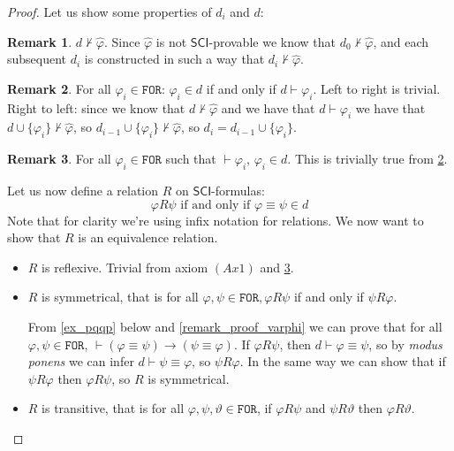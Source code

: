 \documentclass{article}
\theoremstyle{definition}
\theoremstyle{definition}
\theoremstyle{definition}
\newtheorem{remark}{Remark}[section]
\theoremstyle{definition}
\theoremstyle{definition}
\newcommand*{\id}{\equiv}
\newcommand*{\ra}{\rightarrow}
\newcommand*{\FOR}{\texttt{FOR}}
\newcommand{\SCI}{$\mathsf{SCI}$\xspace}
\begin{document}
\begin{proof}
    Let us show some properties of $d_i$ and $d$:
    \begin{remark}
        $d \not \vdash \hat{\varphi}$. Since $\hat{\varphi}$ is not \SCI-provable we know that $d_0 \not \vdash \hat{\varphi}$, and each subsequent $d_i$ is constructed in such a way that $d_i \not \vdash \hat{\varphi}$.
    \end{remark}
    \begin{remark}
        \label{d_in_same_follows}
        For all $\varphi_i \in \FOR$: $\varphi_i \in d$ if and only if $d \vdash
            \varphi_i$. Left to right is trivial. Right to left: since we know that $d \not
            \vdash \hat{\varphi}$ and we have that $d \vdash \varphi_i$ we have that $d
            \cup \{\varphi_i\} \not \vdash \hat{\varphi}$, so $d_{i-1} \cup \{\varphi_i\} \not \vdash \hat{\varphi}$, so $d_i = d_{i-1} \cup
            \{\varphi_i\}$.
    \end{remark}
    \begin{remark}
        \label{d_has_theorems}
        For all $\varphi_i \in \FOR$ such that $\vdash \varphi_i$, $\varphi_i \in d$. This is trivially true from \cref{d_in_same_follows}.
    \end{remark}
    Let us now define a relation $R$ on \SCI-formulas: $$ \varphi R \psi \text{ if
            and only if } \varphi \id \psi \in d $$
    Note that for clarity we're using infix notation for relations. We now want to
    show that $R$ is an equivalence relation.
    \begin{itemize}[]
        \item $R$ is reflexive. Trivial from axiom $(Ax1)$ and \cref{d_has_theorems}.
        \item $R$ is symmetrical, that is for all $\varphi, \psi \in \FOR, \varphi R \psi$ if and only if $\psi R \varphi$.

              From \cref{ex_pqqp} below and \cref{remark_proof_varphi} we can prove that for
              all $\varphi, \psi \in \FOR$, $\vdash (\varphi \id \psi) \ra (\psi \id
                  \varphi)$. If $\varphi R \psi$, then $d \vdash \varphi \id \psi$, so by
              \emph{modus ponens} we can infer $d \vdash \psi \id \varphi$, so $\psi R
                  \varphi$. In the same way we can show that if $\psi R \varphi$ then $\varphi R
                  \psi$, so $R$ is symmetrical.
        \item $R$ is transitive, that is for all $\varphi, \psi, \vartheta \in \FOR$, if $\varphi R \psi$ and $\psi R \vartheta$ then $\varphi R \vartheta$.


\end{itemize}
\end{proof}
\end{document}
